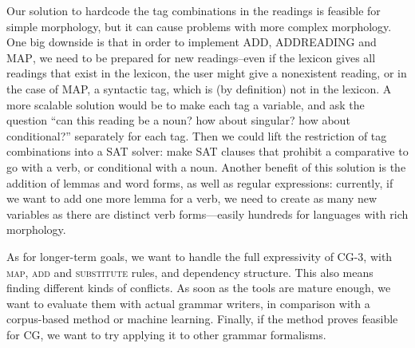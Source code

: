 Our solution to hardcode the tag combinations in the readings is feasible for simple morphology, but it can cause problems with more complex morphology. One big downside is that in order to implement \textsc{ADD}, \textsc{ADDREADING} and \textsc{MAP}, we need to be prepared for new readings--even if the lexicon gives all readings that exist in the lexicon, the user might give a nonexistent reading, or in the case of MAP, a syntactic tag, which is (by definition) not in the lexicon. A more scalable solution would be to make each tag a variable, and ask the question ``can this reading be a noun? how about singular? how about conditional?'' separately for each tag. Then we could lift the restriction of tag combinations into a SAT solver: make SAT clauses that prohibit a comparative to go with a verb, or conditional with a noun.
Another benefit of this solution is the addition of lemmas and word forms, as well as regular expressions: currently, if we want to add one more lemma for a verb, we need to create as many new variables as there are distinct verb forms---easily hundreds for languages with rich morphology.


As for longer-term goals, we want to handle the full expressivity of CG-3,
with \textsc{map}, \textsc{add} and \textsc{substitute} rules, and
dependency structure. This also means finding different kinds of conflicts.
As soon as the tools are mature enough, we want to
evaluate them with actual grammar writers,
in comparison with a corpus-based method or machine learning.
Finally, if the method proves feasible for CG, we want
to try applying it to other grammar formalisms.



